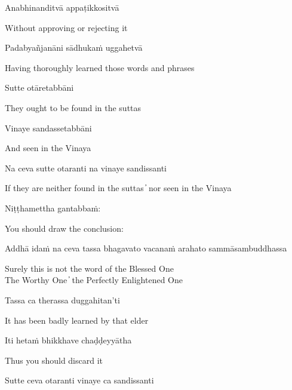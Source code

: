 Anabhinanditvā appaṭikkositvā

\begin{cprenglish}
  Without approving or rejecting it
\end{cprenglish}

Padabyañjanāni sādhukaṁ uggahetvā

\begin{cprenglish}
  Having thoroughly learned those words and phrases
\end{cprenglish}

Sutte otāretabbāni

\begin{cprenglish}
  They ought to be found in the suttas
\end{cprenglish}

Vinaye sandassetabbāni

\begin{cprenglish}
  And seen in the Vinaya
\end{cprenglish}

Na ceva sutte otaranti na vinaye sandissanti

\begin{cprenglish}
  If they are neither found in the suttas  ̓  nor seen in the Vinaya
\end{cprenglish}

Niṭṭhamettha gantabbaṁ:

\begin{cprenglish}
  You should draw the conclusion:
\end{cprenglish}

Addhā idaṁ na ceva tassa bhagavato vacanaṁ arahato sammāsambuddhassa

\begin{cprenglish}
  Surely this is not the word of the Blessed One\\
  The Worthy One  ̓  the Perfectly Enlightened One
\end{cprenglish}

Tassa ca therassa duggahitan’ti

\begin{cprenglish}
  It has been badly learned by that elder
\end{cprenglish}

Iti hetaṁ bhikkhave chaḍḍeyyātha

\begin{cprenglish}
  Thus you should discard it
\end{cprenglish}

Sutte ceva otaranti vinaye ca sandissanti

